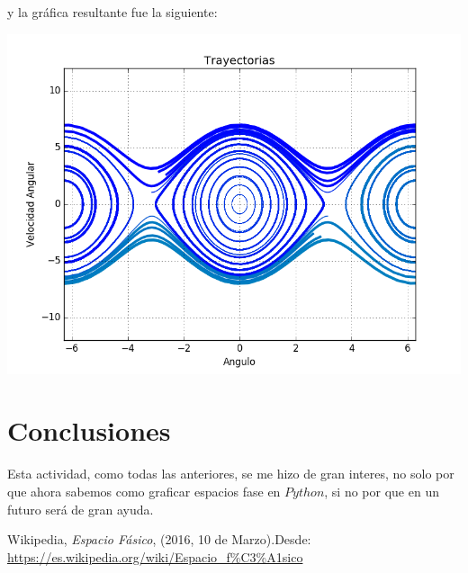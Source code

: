 \documentclass[12pt,letterpaper]{article}
\begin{document}
y la gráfica resultante fue la siguiente: 
\begin{center}

\includegraphics[scale=0.6]{actividad7.png}

\end{center}

 
\section*{Conclusiones}
Esta actividad, como todas las anteriores, se me hizo de gran interes, no solo por que ahora sabemos como graficar espacios fase en $Python$, si no por que en un futuro será de gran ayuda.

\begin{thebibliography}{widestlabel}
       Wikipedia, \emph{Espacio Fásico}, (2016, 10 de Marzo).Desde: \url{https://es.wikipedia.org/wiki/Espacio_f\%C3\%A1sico}
\end{thebibliography}
\end{document}
